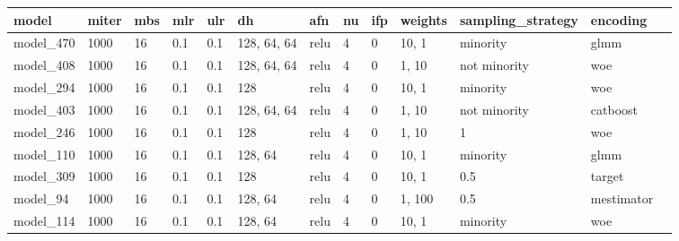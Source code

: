 \begin{tabular}{|l|l|l|l|l|l|l|l|l|l|l|l|l|}
\hline
\textbf{model} & \textbf{miter} & \textbf{mbs} & \textbf{mlr} & \textbf{ulr} & \textbf{dh} & \textbf{afn} & \textbf{nu} & \textbf{ifp} & \textbf{weights} & \textbf{sampling\_strategy} & \textbf{encoding} & \textbf{} \\ \hline
model\_470     & 1000           & 16           & 0.1          & 0.1          & 128, 64, 64 & relu         & 4           & 0            & 10, 1            & minority                    & glmm              &           \\ \hline
model\_408     & 1000           & 16           & 0.1          & 0.1          & 128, 64, 64 & relu         & 4           & 0            & 1, 10            & not minority                & woe               &           \\ \hline
model\_294     & 1000           & 16           & 0.1          & 0.1          & 128         & relu         & 4           & 0            & 10, 1            & minority                    & woe               &           \\ \hline
model\_403     & 1000           & 16           & 0.1          & 0.1          & 128, 64, 64 & relu         & 4           & 0            & 1, 10            & not minority                & catboost          &           \\ \hline
model\_246     & 1000           & 16           & 0.1          & 0.1          & 128         & relu         & 4           & 0            & 1, 10            & 1                           & woe               &           \\ \hline
model\_110     & 1000           & 16           & 0.1          & 0.1          & 128, 64     & relu         & 4           & 0            & 10, 1            & minority                    & glmm              &           \\ \hline
model\_309     & 1000           & 16           & 0.1          & 0.1          & 128         & relu         & 4           & 0            & 10, 1            & 0.5                         & target            &           \\ \hline
model\_94      & 1000           & 16           & 0.1          & 0.1          & 128, 64     & relu         & 4           & 0            & 1, 100           & 0.5                         & mestimator        &           \\ \hline
model\_114     & 1000           & 16           & 0.1          & 0.1          & 128, 64     & relu         & 4           & 0            & 10, 1            & minority                    & woe               &           \\ \hline

\end{tabular}
